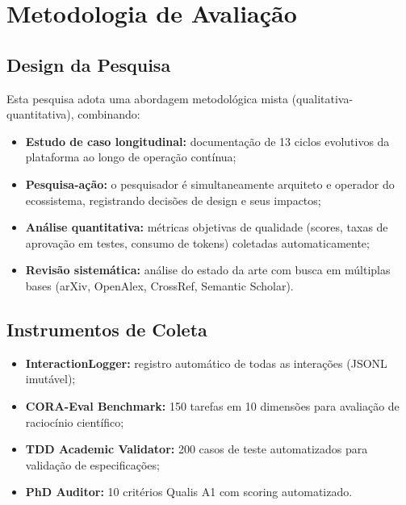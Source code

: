 \documentclass[12pt,a4paper,sumario=tradicional]{abntex2}
\begin{document}
\chapter{Metodologia de Avaliação}

\section{Design da Pesquisa}

Esta pesquisa adota uma abordagem metodológica mista (qualitativa-quantitativa), combinando:

\begin{itemize}
    \item \textbf{Estudo de caso longitudinal:} documentação de 13 ciclos evolutivos da plataforma ao longo de operação contínua;
    \item \textbf{Pesquisa-ação:} o pesquisador é simultaneamente arquiteto e operador do ecossistema, registrando decisões de design e seus impactos;
    \item \textbf{Análise quantitativa:} métricas objetivas de qualidade (scores, taxas de aprovação em testes, consumo de tokens) coletadas automaticamente;
    \item \textbf{Revisão sistemática:} análise do estado da arte com busca em múltiplas bases (arXiv, OpenAlex, CrossRef, Semantic Scholar).
\end{itemize}

\section{Instrumentos de Coleta}

\begin{itemize}
    \item \textbf{InteractionLogger:} registro automático de todas as interações (JSONL imutável);
    \item \textbf{CORA-Eval Benchmark:} 150 tarefas em 10 dimensões para avaliação de raciocínio científico;
    \item \textbf{TDD Academic Validator:} 200 casos de teste automatizados para validação de especificações;
    \item \textbf{PhD Auditor:} 10 critérios Qualis A1 com scoring automatizado.
\end{itemize}
\end{document}
